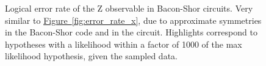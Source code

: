 \documentclass[onecolumn,unpublished,a4paper]{quantumarticle}
\theoremstyle{definition}
\theoremstyle{definition}
\theoremstyle{definition}
\newcommand{\fig}[1]{\hyperref[fig:#1]{Figure~\ref*{fig:#1}}}
\begin{document}
\begin{figure}[H]
    \centering
    \caption{
        Logical error rate of the Z observable in Bacon-Shor circuits.
        Very similar to \fig{error_rate_x}, due to approximate symmetries in the Bacon-Shor code and in the circuit.
        Highlights correspond to hypotheses with a likelihood within a factor of 1000 of the max likelihood hypothesis, given the sampled data.
    }
    \label{fig:error_rate_z}
\end{figure}
\end{document}
